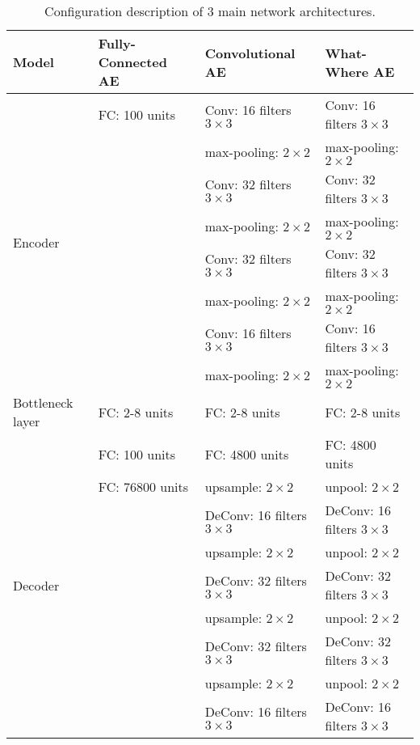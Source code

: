 \begin{table}
\begin{center}
    \begin{tabular}{| p{25mm} | p{30mm} | p{40mm} | p{40mm} |}
      \hline
       Model & Fully-Connected AE & Convolutional AE & What-Where AE \\ \hline
       \multirow{8}{*}{Encoder}		& FC: 100 units & Conv: 16 filters $3\times 3$& Conv: 16 filters $3 \times 3$ \\
       & & max-pooling:  $2 \times 2$ & max-pooling:  $2 \times 2$  \\
       & & Conv: 32 filters $3 \times 3$ & Conv: 32 filters $3 \times 3$ \\
       & & max-pooling:  $2 \times 2$ & max-pooling:  $2 \times 2$  \\
       & & Conv: 32 filters $3 \times 3$ & Conv: 32 filters $3 \times 3$ \\
       & & max-pooling:  $2 \times 2$ & max-pooling:  $2 \times 2$  \\
       & & Conv: 16 filters $3 \times 3$ & Conv: 16 filters $3 \times 3$ \\
       & & max-pooling:  $2 \times 2$ & max-pooling:  $2 \times 2$  \\
     \hline
     Bottleneck \newline layer & FC: 2-8 units & FC: 2-8 units &FC: 2-8 units \\ \hline
     \multirow{9}{*}{Decoder}	& FC: 100 units & FC: 4800 units & FC: 4800 units \\
     & FC: 76800 units & upsample:  $2 \times 2$ & unpool:  $2 \times 2$ \\
            & & DeConv: 16 filters $3 \times 3$ & DeConv: 16 filters $3 \times 3$ \\
            & & upsample:  $2 \times 2$ & unpool:  $2 \times 2$  \\
            & & DeConv: 32 filters $3 \times 3$ & DeConv: 32 filters $3 \times 3$ \\
            & & upsample:  $2 \times 2$ & unpool:  $2 \times 2$  \\
            & & DeConv: 32 filters $3 \times 3$ & DeConv: 32 filters $3 \times 3$ \\
            & & upsample:  $2 \times 2$ & unpool:  $2 \times 2$  \\
            & & DeConv: 16 filters $3 \times 3$ & DeConv: 16 filters $3 \times 3$ \\
          \hline
    \end{tabular}
\end{center}
  \caption{Configuration description of 3 main network architectures.}
  \label{tab:nets}
\end{table}


